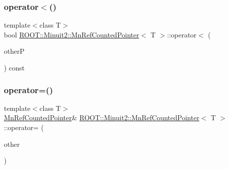 \subsubsection{\texorpdfstring{operator$<$()}{operator<()}\hspace{0.1cm}{\footnotesize\ttfamily [3/3]}}
{\footnotesize\ttfamily template$<$class T$>$ \\
bool \mbox{\hyperlink{classROOT_1_1Minuit2_1_1MnRefCountedPointer}{R\+O\+O\+T\+::\+Minuit2\+::\+Mn\+Ref\+Counted\+Pointer}}$<$ T $>$\+::operator$<$ (\begin{DoxyParamCaption}\item[{const T $\ast$}]{otherP }\end{DoxyParamCaption}) const\hspace{0.3cm}{\ttfamily [inline]}}

\mbox{\label{classROOT_1_1Minuit2_1_1MnRefCountedPointer_a6a7380791625cf84a89a3b4fa32b7029}} 
\subsubsection{\texorpdfstring{operator=()}{operator=()}\hspace{0.1cm}{\footnotesize\ttfamily [1/6]}}
{\footnotesize\ttfamily template$<$class T$>$ \\
\mbox{\hyperlink{classROOT_1_1Minuit2_1_1MnRefCountedPointer}{Mn\+Ref\+Counted\+Pointer}}\& \mbox{\hyperlink{classROOT_1_1Minuit2_1_1MnRefCountedPointer}{R\+O\+O\+T\+::\+Minuit2\+::\+Mn\+Ref\+Counted\+Pointer}}$<$ T $>$\+::operator= (\begin{DoxyParamCaption}\item[{const \mbox{\hyperlink{classROOT_1_1Minuit2_1_1MnRefCountedPointer}{Mn\+Ref\+Counted\+Pointer}}$<$ T $>$ \&}]{other }\end{DoxyParamCaption})\hspace{0.3cm}{\ttfamily [inline]}}

\mbox{\label{classROOT_1_1Minuit2_1_1MnRefCountedPointer_a6a7380791625cf84a89a3b4fa32b7029}} 
